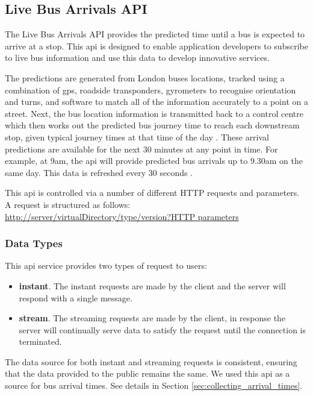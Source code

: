 \subsection{Live Bus Arrivals API}
\par The Live Bus Arrivals API provides the predicted time until a bus is expected to arrive at a stop. This \acrshort{api} is designed to enable application developers to subscribe to live bus information and use this data to develop innovative services\cite{live_bus_api_documentation}.

\par The predictions are generated from London buses locations, tracked using a combination of \acrfull{gps}, roadside transponders, gyrometers to recognise orientation and turns, and software to match all of the information accurately to a point on a street. Next, the bus location information is transmitted back to a control centre which then works out the predicted bus journey time to reach each downstream stop, given typical journey times at that time of the day \cite{quora_generate_countdown}. These arrival predictions are available for the next 30 minutes at any point in time. For example, at 9am, the \acrshort{api} will provide predicted bus arrivals up to 9.30am on the same day. This data is refreshed every 30 seconds \cite{live_bus_api_documentation}.

\par This \acrshort{api} is controlled via a number of different HTTP requests and parameters. A request is structured as follows: \\
\url{http://server/virtualDirectory/type/version?HTTP parameters}

\subsubsection{Data Types}

\par This \acrshort{api} service provides two types of request to users:

\begin{itemize}
  \item \textbf{instant}. The instant requests are made by the client and the server will respond with a single message.
  \item \textbf{stream}. The streaming requests are made by the client, in response the server will continually serve data to satisfy the request until the connection is terminated.
\end{itemize}

\par The data source for both instant and streaming requests is consistent, ensuring that the data provided to the public remains the same. We used this \acrshort{api} as a source for bus arrival times. See details in Section \ref{sec:collecting_arrival_times}.

